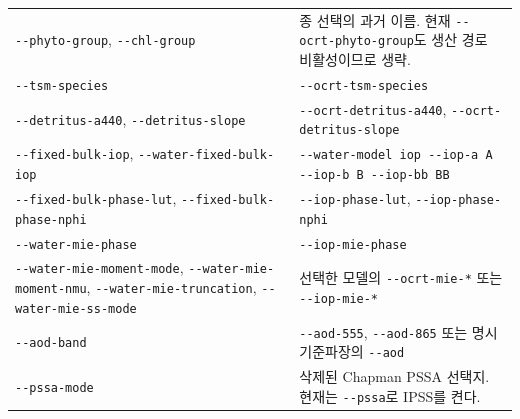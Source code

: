 {\begin{longtable}{@{}>{\raggedright\arraybackslash}p{}>{\raggedright\arraybackslash}p{}@{}}
\texttt{-\allowbreak{}-\allowbreak{}phyto-\allowbreak{}group}, \texttt{-\allowbreak{}-\allowbreak{}chl-\allowbreak{}group} & 종 선택의 과거 이름. 현재 \texttt{-\allowbreak{}-\allowbreak{}ocrt-\allowbreak{}phyto-\allowbreak{}group}도 생산 경로 비활성이므로 생략. \\
\texttt{-\allowbreak{}-\allowbreak{}tsm-\allowbreak{}species} & \texttt{-\allowbreak{}-\allowbreak{}ocrt-\allowbreak{}tsm-\allowbreak{}species} \\
\texttt{-\allowbreak{}-\allowbreak{}detritus-\allowbreak{}a440}, \texttt{-\allowbreak{}-\allowbreak{}detritus-\allowbreak{}slope} & \texttt{-\allowbreak{}-\allowbreak{}ocrt-\allowbreak{}detritus-\allowbreak{}a440}, \texttt{-\allowbreak{}-\allowbreak{}ocrt-\allowbreak{}detritus-\allowbreak{}slope} \\
\texttt{-\allowbreak{}-\allowbreak{}fixed-\allowbreak{}bulk-\allowbreak{}iop}, \texttt{-\allowbreak{}-\allowbreak{}water-\allowbreak{}fixed-\allowbreak{}bulk-\allowbreak{}iop} & \texttt{-\allowbreak{}-\allowbreak{}water-\allowbreak{}model iop -\allowbreak{}-\allowbreak{}iop-\allowbreak{}a A -\allowbreak{}-\allowbreak{}iop-\allowbreak{}b B -\allowbreak{}-\allowbreak{}iop-\allowbreak{}bb BB} \\
\texttt{-\allowbreak{}-\allowbreak{}fixed-\allowbreak{}bulk-\allowbreak{}phase-\allowbreak{}lut}, \texttt{-\allowbreak{}-\allowbreak{}fixed-\allowbreak{}bulk-\allowbreak{}phase-\allowbreak{}nphi} & \texttt{-\allowbreak{}-\allowbreak{}iop-\allowbreak{}phase-\allowbreak{}lut}, \texttt{-\allowbreak{}-\allowbreak{}iop-\allowbreak{}phase-\allowbreak{}nphi} \\
\texttt{-\allowbreak{}-\allowbreak{}water-\allowbreak{}mie-\allowbreak{}phase} & \texttt{-\allowbreak{}-\allowbreak{}iop-\allowbreak{}mie-\allowbreak{}phase} \\
\texttt{-\allowbreak{}-\allowbreak{}water-\allowbreak{}mie-\allowbreak{}moment-\allowbreak{}mode}, \texttt{-\allowbreak{}-\allowbreak{}water-\allowbreak{}mie-\allowbreak{}moment-\allowbreak{}nmu}, \texttt{-\allowbreak{}-\allowbreak{}water-\allowbreak{}mie-\allowbreak{}truncation}, \texttt{-\allowbreak{}-\allowbreak{}water-\allowbreak{}mie-\allowbreak{}ss-\allowbreak{}mode} & 선택한 모델의 \texttt{-\allowbreak{}-\allowbreak{}ocrt-\allowbreak{}mie-\allowbreak{}*} 또는 \texttt{-\allowbreak{}-\allowbreak{}iop-\allowbreak{}mie-\allowbreak{}*} \\
\texttt{-\allowbreak{}-\allowbreak{}aod-\allowbreak{}band} & \texttt{-\allowbreak{}-\allowbreak{}aod-\allowbreak{}555}, \texttt{-\allowbreak{}-\allowbreak{}aod-\allowbreak{}865} 또는 명시 기준파장의 \texttt{-\allowbreak{}-\allowbreak{}aod} \\
\texttt{-\allowbreak{}-\allowbreak{}pssa-\allowbreak{}mode} & 삭제된 Chapman PSSA 선택지. 현재는 \texttt{-\allowbreak{}-\allowbreak{}pssa}로 IPSS를 켠다. \\
\end{longtable}
}

